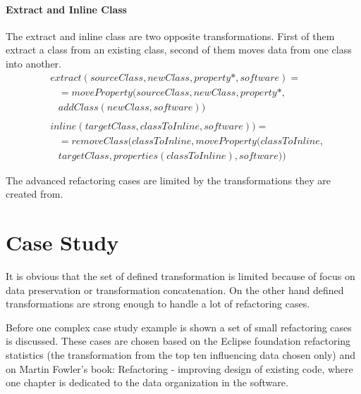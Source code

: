 \documentclass[runningheads]{comsis}
\begin{document}
\paragraph{Extract and Inline Class}
The extract and inline class are two opposite transformations. First of them extract a class from an existing class, second of them moves data from one class into another.
\begin{align}
& extract(sourceClass, newClass, property*, software) = \nonumber  \\ 
& \; \; \; = moveProperty(sourceClass, newClass, property*, \nonumber \\ 
& \; \; \; addClass(newClass, software))
\\ \nonumber  \\
& inline(targetClass, classToInline, software)) =  \nonumber \\
& \; \; \; = removeClass(classToInline, moveProperty(classToInline, \nonumber \\
& \; \; \; targetClass, properties(classToInline), software))
\end{align}

The advanced refactoring cases are limited by the transformations they are created from.

\section{Case Study}
\label{sec:case}
It is obvious that the set of defined transformation is limited because of focus on data preservation or transformation concatenation. On the other hand defined transformations are strong enough to handle a lot of refactoring cases. 

Before one complex case study example is shown a set of small refactoring cases is discussed. These cases are chosen based on the Eclipse foundation refactoring statistics (the transformation from the top ten influencing data chosen only) and on Martin Fowler's book: Refactoring - improving design of existing code, where one chapter is dedicated to the data organization in the software. 
\end{document}
